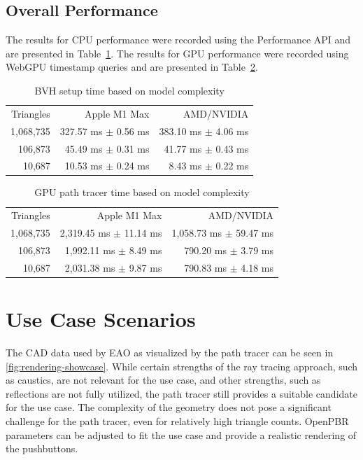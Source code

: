 \subsection{Overall Performance}

The results for CPU performance were recorded using the Performance API and are presented in Table~\ref{tab:cpuPerformance}. The results for GPU performance were recorded using \gls{WebGPU} timestamp queries and are presented in Table~\ref{tab:gpuPerformance}.


\begin{table}[H]
  \centering
  \begin{tabular}{rrr}
    \toprule
    Triangles   & Apple M1 Max    & AMD/NVIDIA \\
    1,068,735     & 327.57 ms $\pm$ 0.56 ms     & 383.10 ms $\pm$ 4.06 ms \\
    106,873     & 45.49 ms $\pm$ 0.31 ms    & 41.77 ms $\pm$ 0.43 ms \\
    10,687     & 10.53 ms $\pm$ 0.24 ms    & 8.43 ms $\pm$ 0.22 ms \\
    \bottomrule
  \end{tabular}
  \caption{BVH setup time based on model complexity}
  \label{tab:cpuPerformance}
\end{table}

\begin{table}[H]
  \centering
  \begin{tabular}{rrr}
    \toprule
    Triangles   & Apple M1 Max    & AMD/NVIDIA \\
    1,068,735     & 2,319.45 ms $\pm$ 11.14 ms    & 1,058.73 ms $\pm$ 59.47 ms \\
    106,873     & 1,992.11 ms $\pm$ 8.49 ms    & 790.20 ms $\pm$ 3.79 ms\\
    10,687     & 2,031.38 ms $\pm$ 9.87 ms    & 790.83 ms $\pm$ 4.18 ms \\
    \bottomrule
  \end{tabular}
  \caption{GPU path tracer time based on model complexity}
  \label{tab:gpuPerformance}
\end{table}
  

\section{Use Case Scenarios}

The \gls{CAD} data used by EAO as visualized by the path tracer can be seen in \autoref{fig:rendering-showcase}. While certain strengths of the ray tracing approach, such as caustics, are not relevant for the use case, and other strengths, such as reflections are not fully utilized, the path tracer still provides a suitable candidate for the use case. The complexity of the geometry does not pose a significant challenge for the path tracer, even for relatively high triangle counts. \gls{OpenPBR} parameters can be adjusted to fit the use case and provide a realistic rendering of the pushbuttons.

